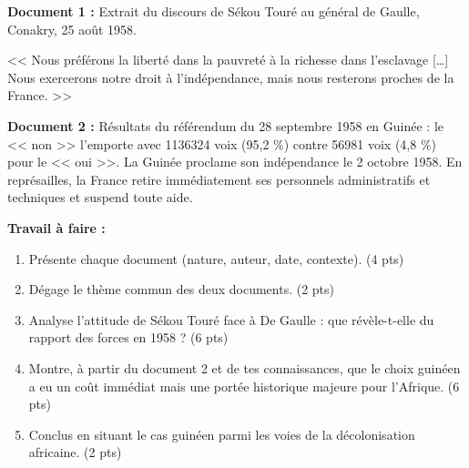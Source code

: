 \documentclass[11pt]{article}
\begin{document}
\begin{exercice}
\textbf{Document 1 :} Extrait du discours de Sékou Touré au général de Gaulle, Conakry, 25 août 1958.

<< Nous préférons la liberté dans la pauvreté à la richesse dans l'esclavage [\dots] Nous exercerons notre droit à l'indépendance, mais nous resterons proches de la France. >>

\textbf{Document 2 :} Résultats du référendum du 28 septembre 1958 en Guinée : le << non >> l'emporte avec \num{1136324} voix (95,2 \%) contre \num{56981} voix (4,8 \%) pour le << oui >>. La Guinée proclame son indépendance le 2 octobre 1958. En représailles, la France retire immédiatement ses personnels administratifs et techniques et suspend toute aide.

\textbf{Travail à faire :}
\begin{enumerate}
\item Présente chaque document (nature, auteur, date, contexte). (4 pts)
\item Dégage le thème commun des deux documents. (2 pts)
\item Analyse l'attitude de Sékou Touré face à De Gaulle : que révèle-t-elle du rapport des forces en 1958 ? (6 pts)
\item Montre, à partir du document 2 et de tes connaissances, que le choix guinéen a eu un coût immédiat mais une portée historique majeure pour l'Afrique. (6 pts)
\item Conclus en situant le cas guinéen parmi les voies de la décolonisation africaine. (2 pts)
\end{enumerate}
\end{exercice}
\end{document}
